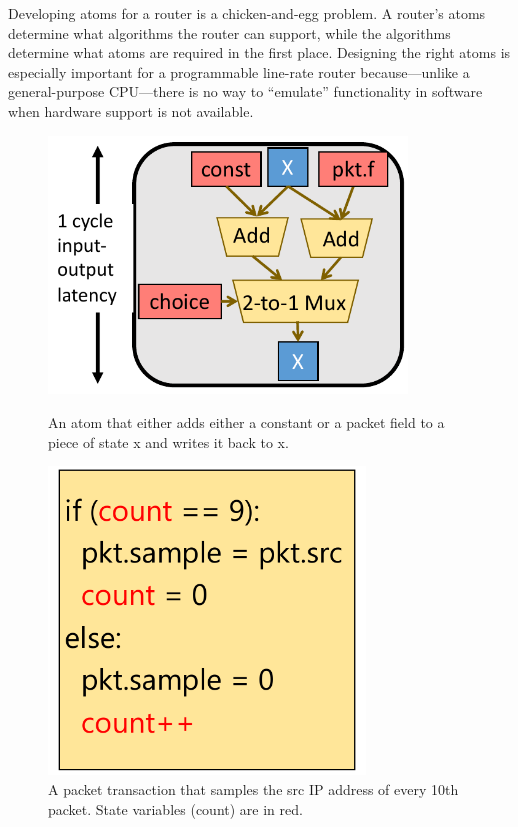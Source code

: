 Developing atoms for a router is a chicken-and-egg problem. A router's atoms
determine what algorithms the router can support, while the algorithms
determine what atoms are required in the first place. Designing the right atoms
is especially important for a programmable line-rate router because---unlike a
general-purpose CPU---there is no way to ``emulate'' functionality in software
when hardware support is not available.

\begin{figure}[!t]
\begin{minipage}{0.48\textwidth}
\centering
\vspace{0.38in}
\includegraphics[width=0.85\textwidth]{atom.pdf}
\caption{An atom that either adds either a constant or a packet field to a
piece of state x and writes it back to x.}
\label{fig:simple_atom}
\end{minipage}
\hfill
\begin{minipage}{0.48\textwidth}
\centering
\includegraphics[width=0.75\textwidth]{packet_transaction.pdf}
\caption{A packet transaction that samples the src IP address of every 10th
packet. State variables (count) are in red.}
\label{fig:simple_transaction}
\end{minipage}
\end{figure}


